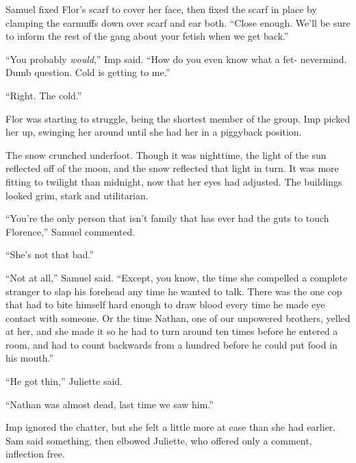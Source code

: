 Samuel fixed Flor's scarf to cover her face, then fixed the scarf in place by clamping the earmuffs down over scarf and ear both.  ``Close enough.  We'll be sure to inform the rest of the gang about your fetish when we get back.''



``You probably \emph{would},'' Imp said.  ``How do you even know what a fet- nevermind.  Dumb question.  Cold is getting to me.''



``Right.  The cold.''



Flor was starting to struggle, being the shortest member of the group.  Imp picked her up, swinging her around until she had her in a piggyback position.



The snow crunched underfoot.  Though it was nighttime, the light of the sun reflected off of the moon, and the snow reflected that light in turn.  It was more fitting to twilight than midnight, now that her eyes had adjusted.  The buildings looked grim, stark and utilitarian.



``You're the only person that isn't family that has ever had the guts to touch Florence,'' Samuel commented.



``She's not that bad.''



``Not at all,'' Samuel said.  ``Except, you know, the time she compelled a complete stranger to slap his forehead any time he wanted to talk.  There was the one cop that had to bite himself hard enough to draw blood every time he made eye contact with someone.  Or the time Nathan, one of our unpowered brothers, yelled at her, and she made it so he had to turn around ten times before he entered a room, and had to count backwards from a hundred before he could put food in his mouth.''



``He got thin,'' Juliette said.



``Nathan was almost dead, last time we saw him.''



Imp ignored the chatter, but she felt a little more at ease than she had earlier.  Sam said something, then elbowed Juliette, who offered only a comment, inflection free.



